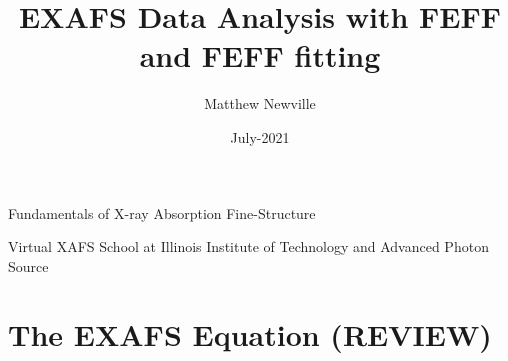 \documentclass[9pt,aspectratio=1610]{beamer}
\begin{document}
\title[Virtual XAFS School]{EXAFS Data Analysis with FEFF and FEFF fitting}
\author[M Newville]{Matthew Newville}
\date{July-2021}


\begin{frame} \titlepage
  \vmm
  \begin{center}
    Fundamentals of X-ray Absorption Fine-Structure
  \end{center}

  \vmm

  \begin{cenpage}{60mm}
    Virtual XAFS School at Illinois Institute of Technology and Advanced
  Photon Source
\end{cenpage}
\end{frame}

\section{The EXAFS Equation (REVIEW)}








% 
% 
% 
% 
\end{document}
